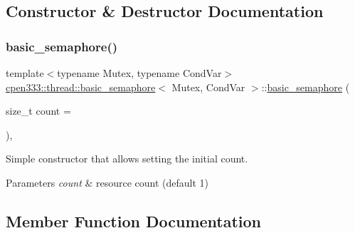 \subsection{Constructor \& Destructor Documentation}
\mbox{\label{classcpen333_1_1thread_1_1basic__semaphore_adfcd90a6776f9bdbb580bff6d9fa2a3e}} 
\subsubsection{\texorpdfstring{basic\+\_\+semaphore()}{basic\_semaphore()}}
{\footnotesize\ttfamily template$<$typename Mutex, typename Cond\+Var$>$ \\
\hyperlink{classcpen333_1_1thread_1_1basic__semaphore}{cpen333\+::thread\+::basic\+\_\+semaphore}$<$ Mutex, Cond\+Var $>$\+::\hyperlink{classcpen333_1_1thread_1_1basic__semaphore}{basic\+\_\+semaphore} (\begin{DoxyParamCaption}\item[{size\+\_\+t}]{count = {} }\end{DoxyParamCaption})\hspace{0.3cm}{\ttfamily [inline]}, {\ttfamily [explicit]}}



Simple constructor that allows setting the initial count. 


\begin{DoxyParams}{Parameters}
{\em count} & resource count (default 1) \\
\hline
\end{DoxyParams}


\subsection{Member Function Documentation}
\mbox{\label{classcpen333_1_1thread_1_1basic__semaphore_a3c3cd804e1aaa10f414820867f2e3798}} 
